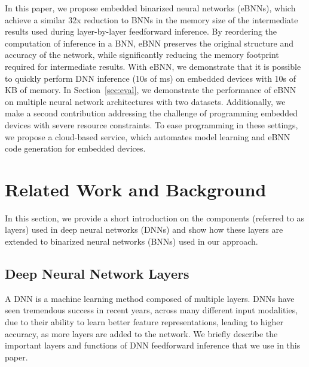 \documentclass[10pt,emptycopyrightspace]{ewsn-proc}
\begin{document}
In this paper, we propose embedded binarized neural networks (eBNNs), which achieve a similar 32x reduction to BNNs in the memory size of the intermediate results used during layer-by-layer feedforward inference. By reordering the computation of inference in a BNN, eBNN preserves the original structure and accuracy of the network, while significantly reducing the memory footprint required for intermediate results. With eBNN, we demonstrate that it is possible to quickly perform DNN inference (10s of ms) on embedded devices with 10s of KB of memory. In Section~\ref{sec:eval}, we demonstrate the performance of eBNN on multiple neural network architectures with two datasets.
Additionally, we make a second contribution addressing the challenge of programming embedded devices with severe resource constraints. To ease programming in these settings, we propose a cloud-based service, which automates model learning and eBNN code generation for embedded devices.


\section{Related Work and Background}
\label{sec:background}
In this section, we provide a short introduction on the components (referred to as layers) used in deep neural networks (DNNs) and show how these layers are extended to binarized neural networks (BNNs) used in our approach.

\subsection{Deep Neural Network Layers}
A DNN is a machine learning method composed of multiple layers. DNNs have seen tremendous success in recent years, across many different input modalities, due to their ability to learn better feature representations, leading to higher accuracy, as more layers are added to the network. We briefly describe the important layers and functions of DNN feedforward inference that we use in this paper.
\end{document}
